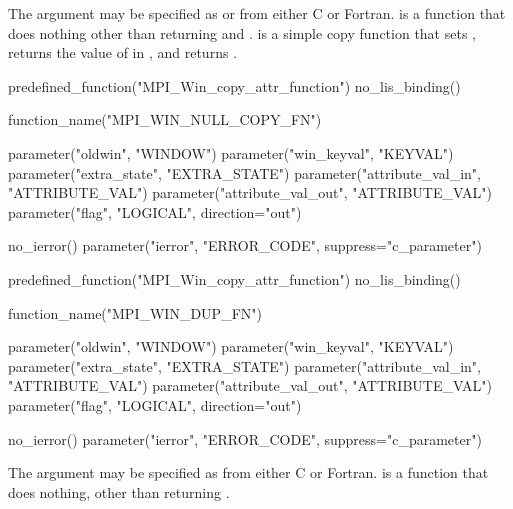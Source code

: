 The argument  may be specified as
 or
from either C or Fortran.
is a function that does nothing other than returning 
and .
 is a simple
copy function that sets ,
returns the value of
 in , and
returns .

\begin{mpi-binding}
    predefined_function("MPI_Win_copy_attr_function")
    no_lis_binding()
    
    function_name("MPI_WIN_NULL_COPY_FN")
    
    parameter("oldwin", "WINDOW")
    parameter("win_keyval", "KEYVAL")
    parameter("extra_state", "EXTRA_STATE")
    parameter("attribute_val_in", "ATTRIBUTE_VAL")
    parameter("attribute_val_out", "ATTRIBUTE_VAL")
    parameter("flag", "LOGICAL", direction="out")
    
    no_ierror()
    parameter("ierror", "ERROR_CODE", suppress="c_parameter")
\end{mpi-binding}

\begin{mpi-binding}
    predefined_function("MPI_Win_copy_attr_function")
    no_lis_binding()
    
    function_name("MPI_WIN_DUP_FN")
    
    parameter("oldwin", "WINDOW")
    parameter("win_keyval", "KEYVAL")
    parameter("extra_state", "EXTRA_STATE")
    parameter("attribute_val_in", "ATTRIBUTE_VAL")
    parameter("attribute_val_out", "ATTRIBUTE_VAL")
    parameter("flag", "LOGICAL", direction="out")
    
    no_ierror()
    parameter("ierror", "ERROR_CODE", suppress="c_parameter")
\end{mpi-binding}

The argument  may be specified as
from either C or Fortran.
 is a function that does nothing, other
than returning .

